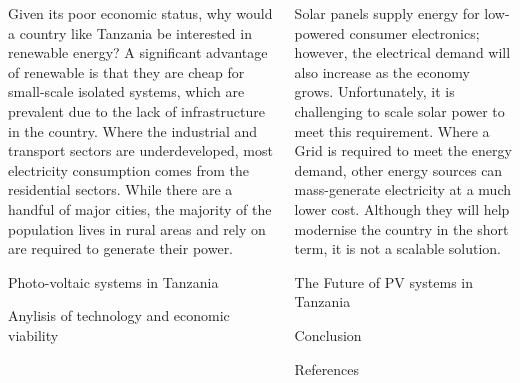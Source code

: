 \documentclass[final]{beamer}
\begin{document}
\begin{frame}[t]
\begin{columns}[t]
\begin{column}{\colwidth}
			\vspace{0.5cm}

			Given its poor economic status, why would a country like Tanzania be interested in renewable energy? A significant advantage of renewable is that they are cheap for small-scale isolated systems, which are prevalent due to the lack of infrastructure in the country. Where the industrial and transport sectors are underdeveloped, most electricity consumption comes from the residential sectors. While there are a handful of major cities, the majority of the population lives in rural areas and rely on are required to generate their power.

      \vspace*{0.5cm}

      


			\begin{block}{Photo-voltaic systems in Tanzania}
				
			\end{block}


			\begin{block}{Anylisis of technology and economic viability}
				
			\end{block}

		\end{column}

		\separatorcolumn

		\begin{column}{\colwidth}

            Solar panels supply energy for low-powered consumer electronics; however, the electrical demand will also increase as the economy grows. Unfortunately, it is challenging to scale solar power to meet this requirement. Where a Grid is required to meet the energy demand, other energy sources can mass-generate electricity at a much lower cost. Although they will help modernise the country in the short term, it is not a scalable solution. 

			\begin{block}{The Future of PV systems in Tanzania}
				
			\end{block}

			\begin{block}{Conclusion}
				
			\end{block}

			\begin{block}{References}
				  \nocite{*}
				  \footnotesize{}
		\end{block}

		\end{column}

		\separatorcolumn
	\end{columns}
\end{frame}
\end{document}
